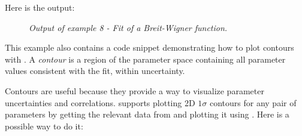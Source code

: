 \documentclass[a4paper,10pt,english]{sphinxmanual}
\begin{document}
Here is the output:
\begin{figure}[htbp]
\centering
\capstart

\caption{\emph{Output of example 8 - Fit of a Breit-Wigner function.}}\end{figure}

This example also contains a code snippet demonstrating how to plot
contours with . A \emph{contour} is a region of the parameter
space containing all parameter values consistent with the fit, within
uncertainty.

Contours are useful because they provide a way to visualize parameter
uncertainties and correlations.  supports plotting
2D $1\sigma$ contours for any pair of parameters by getting the
relevant data from  and plotting it using .
Here is a possible way to do it:
\end{document}
